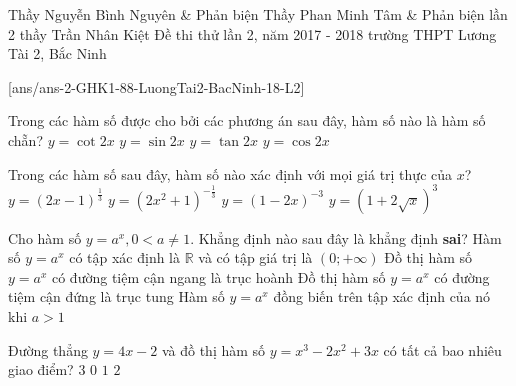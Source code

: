 \begin{name}
		{Thầy Nguyễn Bình Nguyên \& Phản biện Thầy Phan Minh Tâm \& Phản biện lần 2 thầy Trần Nhân Kiệt}
		{Đề thi thử lần 2, năm 2017 - 2018 trường THPT Lương Tài 2, Bắc Ninh}
\end{name}
	\setcounter{ex}{0}
	[ans/ans-2-GHK1-88-LuongTai2-BacNinh-18-L2]		
\begin{ex}%
	Trong các hàm số được cho bởi các phương án sau đây, hàm số nào là hàm số chẵn?
	\choice
	{$y=\cot 2x$}
	{$y=\sin 2x$}
	{$y=\tan 2x$}
	{\True $y=\cos 2x$}
\end{ex}
\begin{ex}%
	Trong các hàm số sau đây, hàm số nào xác định với mọi giá trị thực của $x$?
	\choice
	{$y={\left({2x-1}\right)}^{\frac{1}{3}}$}
	{\True $y=\left({2x^2+1}\right)^{-\frac{1}{3}}$}
	{$y=\left({1-2x}\right)^{-3}$}
	{$y=\left({1+2\sqrt{x}}\right)^3$}
\end{ex}
\begin{ex}%
	Cho hàm số $y=a^x,0<a\ne 1$. Khẳng định nào sau đây là khẳng định \textbf{sai}?
	\choice
	{Hàm số $y=a^x$ có tập xác định là $\mathbb{R}$ và có tập giá trị là $\left({0;+\infty}\right)$}
	{Đồ thị hàm số $y=a^x$ có đường tiệm cận ngang là trục hoành}
	{\True Đồ thị hàm số $y=a^x$ có đường tiệm cận đứng là trục tung}
	{Hàm số $y=a^x$ đồng biến trên tập xác định của nó khi $a>1$}
	\loigiai{
	}
\end{ex}
\begin{ex}%
	Đường thẳng $y=4x-2$ và đồ thị hàm số $y=x^3-2x^2+3x$ có tất cả bao nhiêu giao điểm?
	\choice
	{\True $3$}
	{$0$}
	{$1$}
	{$2$}
\end{ex}
